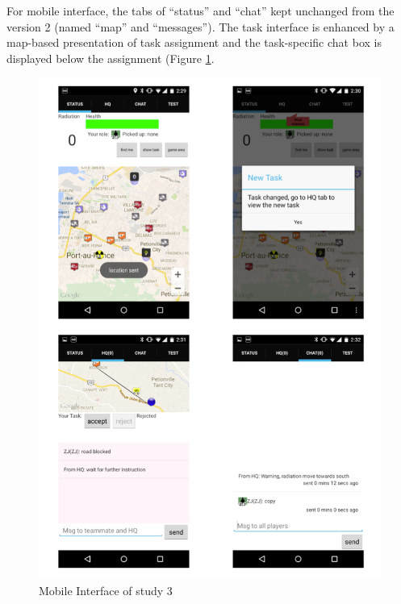 For mobile interface, the tabs of ``status'' and ``chat'' kept unchanged from the version 2 (named ``map'' and ``messages''). The task interface is enhanced by a map-based presentation of task assignment and the task-specific chat box is displayed below the assignment (Figure \ref{fig:study3interfacemobile}.

\begin{figure}[H]
  \centering
  \includegraphics[width=1\textwidth]{img/conclusion/study3interfaceMobile}
  \caption{Mobile Interface of study 3}
  \label{fig:study3interfacemobile}
\end{figure}


